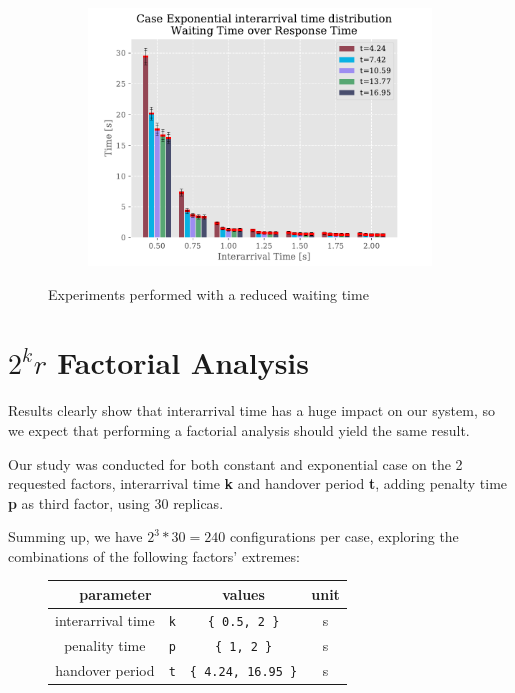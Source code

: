 \documentclass[a4paper,12pt]{article}
\begin{document}
\begin{figure}
\begin{subfigure}[b]{.3\textwidth}
    \includegraphics[width=\textwidth]{img/WaitingTimeOverResponseTimeP1Exp.pdf}
  \end{subfigure}
  \caption{Experiments performed with a reduced waiting time}
  \label{fig:result-2}
\end{figure}

\section{ $2^kr$ Factorial Analysis}
Results clearly show that interarrival time has a huge impact on our system, so we expect that performing a factorial analysis should yield the same result. 

Our study was conducted for both constant and exponential case on the 2 requested factors, interarrival time \textbf{k} and handover period \textbf{t}, adding penalty time \textbf{p} as third factor,
using 30 replicas.  

Summing up, we have $2^3*30 = 240$ configurations per case, exploring the combinations of the following factors' extremes:

\begin{figure}[H]
  \centering
  \begin{tabular}{| c | c | c | c |}\hline
    \multicolumn{2}{|c|}{parameter} & values & unit \\ \hline
    interarrival time & \texttt{k} & \texttt{\{ 0.5, 2 \}} & s \\ \hline
    penality time & \texttt{p} & \texttt{\{ 1, 2 \}} & s \\ \hline
    handover period & \texttt{t} & \texttt{\{ 4.24, 16.95 \}} & s \\ \hline
  \end{tabular}
\end{figure}
\end{document}
